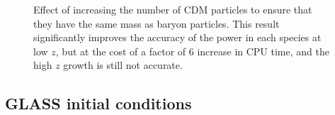 \documentclass[]{article}
\begin{document}
\begin{figure}[h]
	\caption{Effect of increasing the number of CDM particles to ensure that they have the same mass as baryon particles. This result significantly improves the accuracy of the power in each species at low $z$, but at the cost of a factor of 6 increase in CPU time, and the high $z$ growth is still not accurate.}
\end{figure}
\clearpage
\subsection{GLASS initial conditions}
\end{document}
